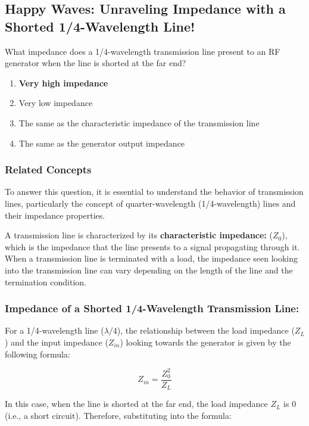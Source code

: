 \subsection{Happy Waves: Unraveling Impedance with a Shorted 1/4-Wavelength Line!}

\begin{tcolorbox}[colback=gray!10, colframe=black, title=E9F09]  
What impedance does a 1/4-wavelength transmission line present to an RF generator when the line is shorted at the far end?

\begin{enumerate}[label=\Alph*.]
    \item \textbf{Very high impedance}
    \item Very low impedance
    \item The same as the characteristic impedance of the transmission line
    \item The same as the generator output impedance
\end{enumerate} \end{tcolorbox}

\subsubsection{Related Concepts}

To answer this question, it is essential to understand the behavior of transmission lines, particularly the concept of quarter-wavelength (1/4-wavelength) lines and their impedance properties.

A transmission line is characterized by its \textbf{characteristic impedance:} (\(Z_0\)), which is the impedance that the line presents to a signal propagating through it. When a transmission line is terminated with a load, the impedance seen looking into the transmission line can vary depending on the length of the line and the termination condition.

\subsubsection*{Impedance of a Shorted 1/4-Wavelength Transmission Line:}

For a 1/4-wavelength line (\(\lambda/4\)), the relationship between the load impedance (\(Z_L\)) and the input impedance (\(Z_{in}\)) looking towards the generator is given by the following formula:

\[
Z_{in} = \frac{Z_0^2}{Z_L}
\]

In this case, when the line is shorted at the far end, the load impedance \(Z_L\) is 0 (i.e., a short circuit). Therefore, substituting into the formula:

